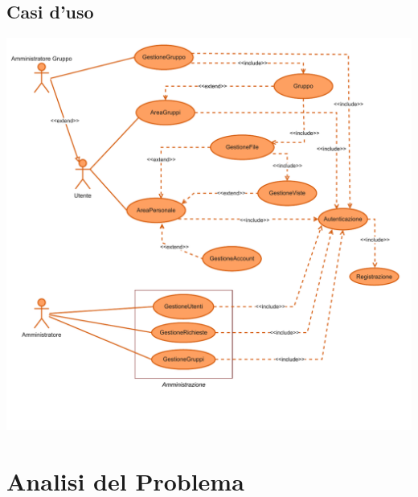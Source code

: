 \documentclass[a4paper,11pt,oneside]{book}
\begin{document}
\newpage
\tableofcontents


\pagebreak


\pagebreak


\pagebreak


\pagebreak

\section*{Casi d'uso}
\begin{adjustwidth}{-2cm}{0cm}
\includegraphics[scale=0.9]{casi d'uso/Casi d'uso-Casi d'uso.drawio.pdf}
\end{adjustwidth}


\pagebreak


\pagebreak

\chapter*{Analisi del Problema}





\pagebreak



\end{document}
